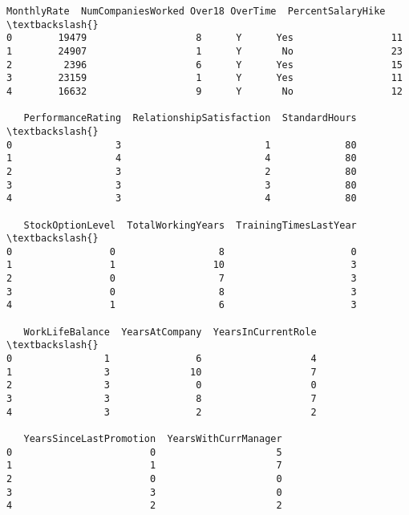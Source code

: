\documentclass[11pt]{article}
\begin{document}
\begin{Verbatim}[commandchars=\\\{\}]
   MonthlyRate  NumCompaniesWorked Over18 OverTime  PercentSalaryHike  \textbackslash{}
0        19479                   8      Y      Yes                 11
1        24907                   1      Y       No                 23
2         2396                   6      Y      Yes                 15
3        23159                   1      Y      Yes                 11
4        16632                   9      Y       No                 12

   PerformanceRating  RelationshipSatisfaction  StandardHours  \textbackslash{}
0                  3                         1             80
1                  4                         4             80
2                  3                         2             80
3                  3                         3             80
4                  3                         4             80

   StockOptionLevel  TotalWorkingYears  TrainingTimesLastYear  \textbackslash{}
0                 0                  8                      0
1                 1                 10                      3
2                 0                  7                      3
3                 0                  8                      3
4                 1                  6                      3

   WorkLifeBalance  YearsAtCompany  YearsInCurrentRole  \textbackslash{}
0                1               6                   4
1                3              10                   7
2                3               0                   0
3                3               8                   7
4                3               2                   2

   YearsSinceLastPromotion  YearsWithCurrManager
0                        0                     5
1                        1                     7
2                        0                     0
3                        3                     0
4                        2                     2
    \end{Verbatim}
\end{document}

